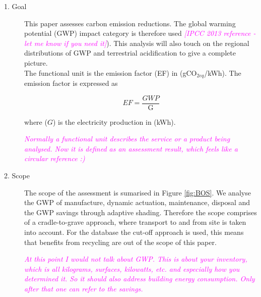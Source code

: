 \begin{description}
\item[1. Goal] This paper assesses carbon emission reductions. The global warming potential (GWP) impact category is therefore used \textcolor{magenta}{\textit{[IPCC 2013 reference - let me know if you need it]}}). This analysis will also touch on the regional distributions of GWP and terrestrial acidification to give a complete picture.\\

The functional unit is the emission factor (EF) in (gCO$_{2eq}$/kWh). The emission factor is expressed as 

\begin{equation}
EF=\frac{GWP}{\mathrm{G}}
\label{eq:EF}
\end{equation}

where ($G$) is the electricity production in (kWh).

\textcolor{magenta}{\textit{Normally a functional unit describes the service or a product being analysed. Now it is defined as an assessment result, which feels like a circular reference :)}}

\item[2. Scope] The scope of the assessment is sumarised in Figure \ref{fig:BOS}. We analyse the GWP of manufacture, dynamic actuation, maintenance, disposal and the GWP savings through adaptive shading. Therefore the scope comprises of a cradle-to-grave approach, where transport to and from site is taken into account. For the database the cut-off approach is used, this means that benefits from recycling are out of the scope of this paper.

\textcolor{magenta}{\textit{At this point I would not talk about GWP. This is about your inventory, which is all kilograms, surfaces, kilowatts, etc. and especially how you determined it. So it should also address building energy consumption. Only after that one can refer to the savings.}}



\end{description}
